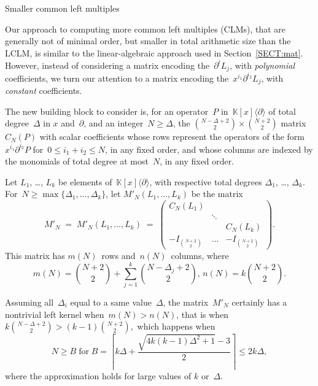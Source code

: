 \documentclass{sig-alt-full}
\def\K {\ensuremath{\mathbb{K}}}
\newcommand{\x}{x}
\newcommand{\Dx}{\partial}
\begin{document}
\begin{section}{\!\!\!\! Smaller common left multiples}

Our approach to computing more common left multiples (CLMs), that are generally
not of minimal order, but smaller in total arithmetic size than the LCLM, is
similar to the linear-algebraic approach used in Section~\ref{SECT:mat}.
However, instead of considering a matrix encoding the~$\partial^iL_j$, with
\emph{polynomial\/} coefficients, we turn our attention to a matrix encoding
the~$x^{i_1}\partial^{i_2}L_j$, with \emph{constant\/} coefficients.

\medskip {} The new building block to consider is, for an operator~$P$ in~$\K[\x]\langle
\Dx\rangle$ of total degree~$\Delta$ in $x$ and~$\partial$, and
an integer~$N\geq\Delta$, the $\binom{N-\Delta+2}2\times\binom{N+2}2$
matrix~$C_N(P)$ with scalar coefficients whose rows represent the operators
of the form~$x^{i_1}\partial^{i_2}P$ for~$0\leq i_1+i_2\leq N$, in any fixed
order, and whose columns are indexed by the monomials of total degree at
most~$N$, in any fixed order.

Let $L_1$, \dots, $L_k$ be elements of~$\K[\x]\langle \Dx\rangle$,  with respective total degrees $\Delta_1$, \dots, $\Delta_k$.
For~$N\geq\max\{\Delta_1,\dots,\Delta_k\}$, let $M'_N(L_1,\dots,L_k)$ be the matrix
\vspace{-0.3cm}
\begin{equation*}
M'_N \; = \; M'_N(L_1,\dots,L_k) \; = \; 
\begin{pmatrix}
C_N(L_1) & & \\
 & \ddots & \\
 & & C_N(L_k) \\
-I_{\binom{N+2}2} & \dots & -I_{\binom{N+2}2}
\end{pmatrix}.
\end{equation*}
This matrix has $m(N)$~rows and~$n(N)$~columns, where
\[
m(N) \!=\! \binom{N+2}2 + \sum_{j=1}^k \binom{N-\Delta_j+2}2, \,
n(N) \!=\! k\binom{N+2}2.
\]

Assuming all~$\Delta_i$ equal to a same value~$\Delta$, the matrix~$M'_N$ certainly has a nontrivial left kernel when~$m(N)>n(N)$, that is when $ k\binom{N-\Delta+2}2 > (k-1)\binom{N+2}2,$
which happens when
\begin{equation*}
N \geq B
\;\text{for}\;
B = \left\lceil
  k\Delta+\frac{\sqrt{4k(k-1)\Delta^2+1}-3}2
\right\rceil \leq 2k\Delta,
\end{equation*}
where the approximation holds for large values of $k$ or~$\Delta$.


\end{section}
\end{document}
